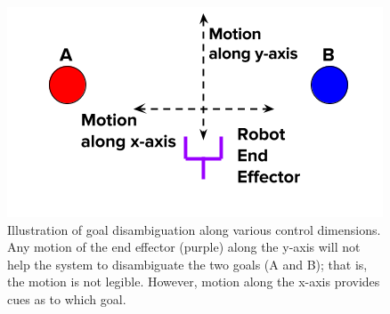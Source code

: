\documentclass[conference]{IEEEtran}
\begin{document}
\begin{figure}[t]
	\centering
	\includegraphics[width = 1.0\hsize]{./figures/DE_NEW.png}
	\vspace{-0.7cm}
	\caption{Illustration of goal disambiguation along various control dimensions. Any motion of the end effector (purple) along the y-axis will not help the system to disambiguate the two goals (A and B); that is, the motion is not legible. However, motion along the x-axis provides cues as to which goal.}
	\label{DE}
\end{figure}

\end{document}
